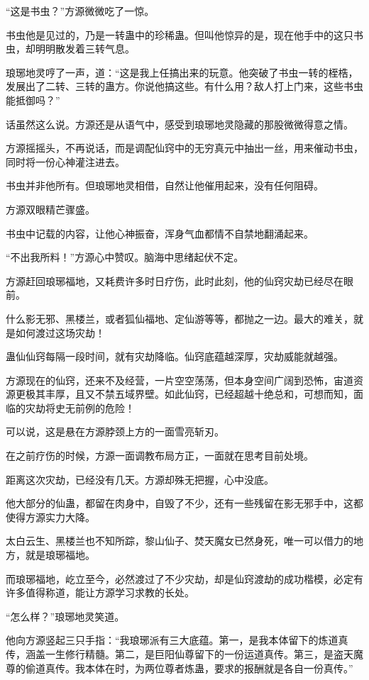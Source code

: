 \begin{this_body}
“这是书虫？”方源微微吃了一惊。

书虫他是见过的，乃是一转蛊中的珍稀蛊。但叫他惊异的是，现在他手中的这只书虫，却明明散发着三转气息。

琅琊地灵哼了一声，道：“这是我上任搞出来的玩意。他突破了书虫一转的桎梏，发展出了二转、三转的蛊方。你说他搞这些。有什么用？敌人打上门来，这些书虫能抵御吗？”

话虽然这么说。方源还是从语气中，感受到琅琊地灵隐藏的那股微微得意之情。

方源摇摇头，不再说话，而是调配仙窍中的无穷真元中抽出一丝，用来催动书虫，同时将一份心神灌注进去。

书虫并非他所有。但琅琊地灵相借，自然让他催用起来，没有任何阻碍。

方源双眼精芒骤盛。

书虫中记载的内容，让他心神振奋，浑身气血都情不自禁地翻涌起来。

“不出我所料！”方源心中赞叹。脑海中思绪起伏不定。

方源赶回琅琊福地，又耗费许多时日疗伤，此时此刻，他的仙窍灾劫已经尽在眼前。

什么影无邪、黑楼兰，或者狐仙福地、定仙游等等，都抛之一边。最大的难关，就是如何渡过这场灾劫！

蛊仙仙窍每隔一段时间，就有灾劫降临。仙窍底蕴越深厚，灾劫威能就越强。

方源现在的仙窍，还来不及经营，一片空空荡荡，但本身空间广阔到恐怖，宙道资源更极其丰厚，且又不禁五域界壁。如此仙窍，已经超越十绝总和，可想而知，面临的灾劫将史无前例的危险！

可以说，这是悬在方源脖颈上方的一面雪亮斩刃。

在之前疗伤的时候，方源一面调教布局方正，一面就在思考目前处境。

距离这次灾劫，已经没有几天。方源却殊无把握，心中没底。

他大部分的仙蛊，都留在肉身中，自毁了不少，还有一些残留在影无邪手中，这都使得方源实力大降。

太白云生、黑楼兰也不知所踪，黎山仙子、焚天魔女已然身死，唯一可以借力的地方，就是琅琊福地。

而琅琊福地，屹立至今，必然渡过了不少灾劫，却是仙窍渡劫的成功楷模，必定有许多值得称道，能让方源学习求教的长处。

“怎么样？”琅琊地灵笑道。

他向方源竖起三只手指：“我琅琊派有三大底蕴。第一，是我本体留下的炼道真传，涵盖一生修行精髓。第二，是巨阳仙尊留下的一份运道真传。第三，是盗天魔尊的偷道真传。我本体在时，为两位尊者炼蛊，要求的报酬就是各自一份真传。”


\end{this_body}

